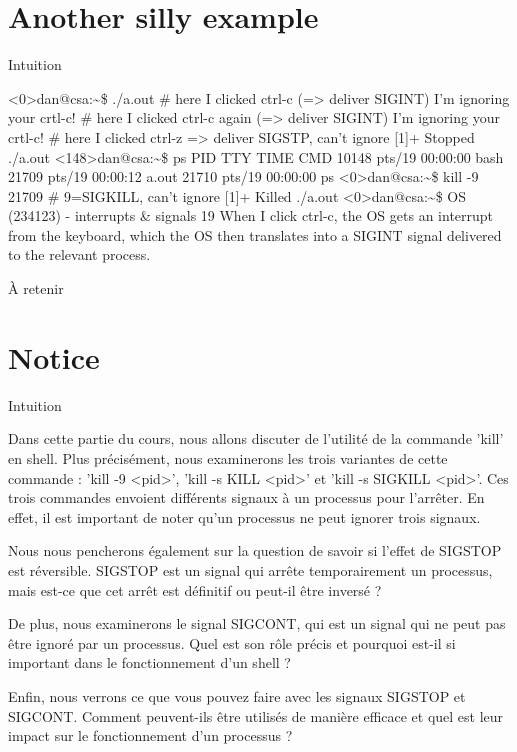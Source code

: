 \documentclass[12pt]{article}
\begin{document}
\section{Another silly example}
\begin{myvulga}{Intuition}
\end{myvulga}
<0>dan@csa:\textasciitilde{}\$ ./a.out
\# here I clicked ctrl-c (=> deliver SIGINT)
I'm ignoring your crtl-c!
\# here I clicked ctrl-c again (=> deliver SIGINT)
I'm ignoring your crtl-c!
\# here I clicked ctrl-z => deliver SIGSTP, can’t ignore
[1]+  Stopped                 ./a.out
<148>dan@csa:\textasciitilde{}\$ ps
PID TTY          TIME CMD
10148 pts/19   00:00:00 bash
21709 pts/19   00:00:12 a.out
21710 pts/19   00:00:00 ps
<0>dan@csa:\textasciitilde{}\$ kill -9 21709   \# 9=SIGKILL, can’t ignore
[1]+  Killed                  ./a.out
<0>dan@csa:\textasciitilde{}\$
OS (234123) - interrupts \& signals
19
When I click ctrl-c, the OS gets an interrupt
from the keyboard, which the OS then
translates into a SIGINT signal delivered to
the relevant process.
\begin{aretenir}{À retenir}
\end{aretenir}

\section{Notice}
\begin{myvulga}{Intuition}
\end{myvulga}
Dans cette partie du cours, nous allons discuter de l'utilité de la commande 'kill' en shell. Plus précisément, nous examinerons les trois variantes de cette commande : 'kill -9 <pid>', 'kill -s KILL <pid>' et 'kill -s SIGKILL <pid>'. Ces trois commandes envoient différents signaux à un processus pour l'arrêter. En effet, il est important de noter qu'un processus ne peut ignorer trois signaux.

Nous nous pencherons également sur la question de savoir si l'effet de SIGSTOP est réversible. SIGSTOP est un signal qui arrête temporairement un processus, mais est-ce que cet arrêt est définitif ou peut-il être inversé ? 

De plus, nous examinerons le signal SIGCONT, qui est un signal qui ne peut pas être ignoré par un processus. Quel est son rôle précis et pourquoi est-il si important dans le fonctionnement d'un shell ?

Enfin, nous verrons ce que vous pouvez faire avec les signaux SIGSTOP et SIGCONT. Comment peuvent-ils être utilisés de manière efficace et quel est leur impact sur le fonctionnement d'un processus ? 
\end{document}
